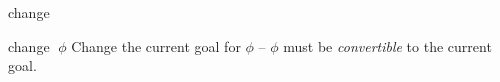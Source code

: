 \begin{tactic}{change}
  \begin{tsyntax}[empty]{change $\;\phi$}
  Change the current goal for $\phi$ -- $\phi$ must be \emph{convertible}
  to the current goal.
  \end{tsyntax}
\end{tactic}
